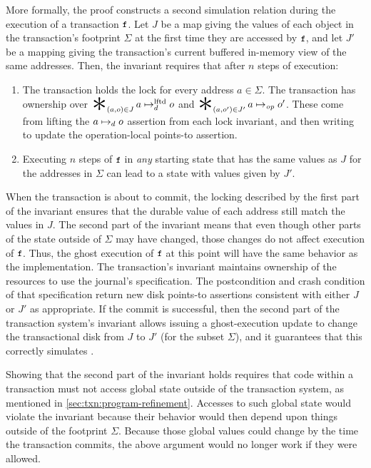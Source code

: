 More formally, the proof constructs a second simulation relation during the
execution of a transaction $\cc{f}$.  Let $J$ be a map giving the values of each
object in the transaction's footprint $\Sigma$ at the first time they are
accessed by $\cc{f}$, and let $J'$ be a mapping giving the transaction's current
buffered in-memory view of the same addresses.  Then, the invariant requires
that after $n$ steps of execution:
%
\begin{enumerate}

\item The transaction holds the lock for every address $a \in \Sigma$. The
transaction has ownership over $\bigast_{(a,o) \in J} a \mapstoLftd o$ and
$\bigast_{(a,o') \in J'} a \mapstoOp o'$. These come from lifting the
$a \mapsto_d o$ assertion from each lock invariant, and then writing to update
the operation-local points-to assertion.

\item Executing $n$ steps of $\cc{f}$ in \emph{any} starting state that has the same
  values as $J$ for the addresses in $\Sigma$ can lead to a state with values given
  by $J'$.

\end{enumerate}
%
When the transaction is about to commit, the locking described by the first part of the
invariant ensures that the durable value of each address still match the values
in $J$. The second part of the invariant means that even though other
parts of the state outside of $\Sigma$ may have changed, those changes do not
affect execution of $\cc{f}$. Thus, the ghost execution of $\cc{f}$ at this point will
have the same behavior as the implementation. The transaction's invariant
maintains ownership of the resources to use the journal's 
specification. The postcondition and crash condition of that specification
return new disk points-to assertions consistent with either $J$ or $J'$ as
appropriate. If the commit is successful, then the second part of the
transaction system's invariant allows issuing a ghost-execution update to change
the transactional disk from $J$ to $J'$ (for the subset $\Sigma$), and it
guarantees that this correctly simulates .

Showing that the second part of the invariant holds requires that code within a
transaction must not access global state outside of the
transaction system, as mentioned in \cref{sec:txn:program-refinement}. Accesses to such global state
would violate the invariant because their behavior would then depend upon
things outside of the footprint $\Sigma$. Because those global values could change
by the time the transaction commits, the above argument would no longer work if they were allowed.

